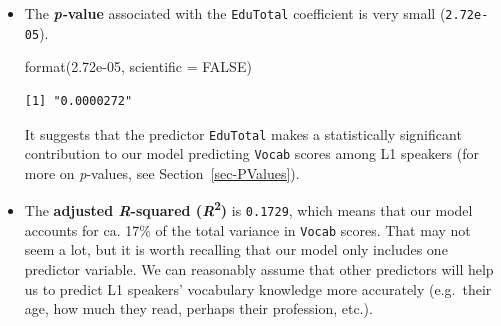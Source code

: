 \documentclass[
  letterpaper,
  DIV=11,
  numbers=noendperiod]{scrreprt}
\newenvironment{Shaded}{\begin{snugshade}}{\end{snugshade}}
\newcommand{\AttributeTok}[1]{\textcolor[rgb]{0.40,0.45,0.13}{#1}}
\newcommand{\ConstantTok}[1]{\textcolor[rgb]{0.56,0.35,0.01}{#1}}
\newcommand{\FloatTok}[1]{\textcolor[rgb]{0.68,0.00,0.00}{#1}}
\newcommand{\FunctionTok}[1]{\textcolor[rgb]{0.28,0.35,0.67}{#1}}
\newcommand{\NormalTok}[1]{\textcolor[rgb]{0.00,0.23,0.31}{#1}}
\begin{document}
\begin{itemize}
\begin{verbatim}
[1] 70.1599
\end{verbatim}
\item
  The \textbf{\emph{p-}value} associated with the \texttt{EduTotal}
  coefficient is very small (\texttt{2.72e-05}).

\begin{Shaded}
\begin{Highlighting}[]
\FunctionTok{format}\NormalTok{(}\FloatTok{2.72e{-}05}\NormalTok{, }\AttributeTok{scientific =} \ConstantTok{FALSE}\NormalTok{)}
\end{Highlighting}
\end{Shaded}

\begin{verbatim}
[1] "0.0000272"
\end{verbatim}

  It suggests that the predictor \texttt{EduTotal} makes a statistically
  significant contribution to our model predicting \texttt{Vocab} scores
  among L1 speakers (for more on \emph{p}-values, see
  Section~\ref{sec-PValues}).
\item
  The \textbf{adjusted \emph{R}-squared (\emph{R}\textsuperscript{2})}
  is \texttt{0.1729}, which means that our model accounts for ca. 17\%
  of the total variance in \texttt{Vocab} scores. That may not seem a
  lot, but it is worth recalling that our model only includes one
  predictor variable. We can reasonably assume that other predictors
  will help us to predict L1 speakers' vocabulary knowledge more
  accurately (e.g.~their age, how much they read, perhaps their
  profession, etc.).
\end{itemize}
\end{document}
